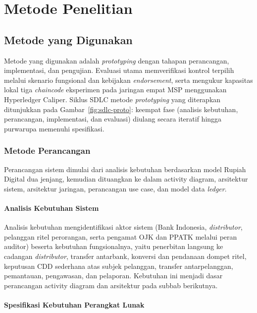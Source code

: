 \chapter{Metode Penelitian}

\section{Metode yang Digunakan}

Metode yang digunakan adalah \textit{prototyping} dengan tahapan perancangan,
implementasi, dan pengujian. Evaluasi utama memverifikasi kontrol terpilih
melalui skenario fungsional dan kebijakan \textit{endorsement}, serta mengukur
kapasitas lokal tiga \textit{chaincode} eksperimen pada jaringan empat MSP
menggunakan Hyperledger Caliper.
Siklus SDLC metode \textit{prototyping} yang diterapkan ditunjukkan
pada Gambar~\ref{fig:sdlc-proto}: keempat fase (analisis kebutuhan, perancangan,
implementasi, dan evaluasi) diulang secara iteratif hingga purwarupa memenuhi
spesifikasi.



\subsection{Metode Perancangan}

Perancangan sistem dimulai dari analisis kebutuhan berdasarkan model Rupiah
Digital dua jenjang, kemudian dituangkan ke dalam activity diagram, arsitektur
sistem, arsitektur jaringan, perancangan use case, dan model data
\textit{ledger}.

\subsubsection{Analisis Kebutuhan Sistem}

Analisis kebutuhan mengidentifikasi aktor sistem (Bank Indonesia,
\textit{distributor}, pelanggan ritel perorangan, serta pengamat OJK dan PPATK melalui peran auditor) beserta
kebutuhan fungsionalnya, yaitu penerbitan langsung ke cadangan \textit{distributor}, transfer antarbank, konversi dan pendanaan dompet ritel,
keputusan CDD sederhana atas subjek pelanggan, transfer antarpelanggan, pemantauan, pengawasan, dan pelaporan.
Kebutuhan ini menjadi dasar perancangan activity diagram dan arsitektur
pada subbab berikutnya.

\subsubsection{Spesifikasi Kebutuhan Perangkat Lunak}

